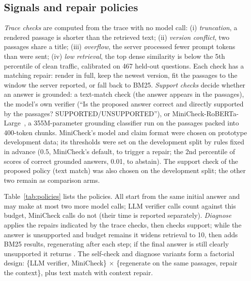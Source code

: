 \subsection{Signals and repair policies}
\emph{Trace checks} are computed from the trace with no model call: (i) \emph{truncation}, a rendered
passage is shorter than the retrieved text; (ii) \emph{version conflict}, two passages share a title;
(iii) \emph{overflow}, the server processed fewer prompt tokens than were sent; (iv) \emph{low
retrieval}, the top dense similarity is below the 5th percentile of clean traffic, calibrated on
467 held-out questions. Each check has a matching repair: render in full, keep the newest version,
fit the passages to the window the server reported, or fall back to BM25. \emph{Support checks}
decide whether an answer is grounded: a text-match check (the answer appears in the passages), the
model's own verifier (``Is the proposed answer correct and directly supported by the passages?
SUPPORTED/UNSUPPORTED''), or MiniCheck-RoBERTa-Large~\cite{tang2024minicheck}, a 355M-parameter
grounding classifier run on the passages packed into 400-token chunks. MiniCheck's model and claim
format were chosen on prototype development data; its thresholds were set on the development split by
rules fixed in advance (0.5, MiniCheck's default, to trigger a repair; the 2nd percentile of scores
of correct grounded answers, 0.01, to abstain). The support check of the proposed policy (text
match) was also chosen on the development split; the other two remain as comparison arms.

Table~\ref{tab:policies} lists the policies. All start from the same initial answer and may make at
most two more model calls; LLM verifier calls count against this budget, MiniCheck calls do not
(their time is reported separately). \emph{Diagnose} applies the repairs indicated by the trace
checks, then checks support; while the answer is unsupported and budget remains it widens
retrieval to 10, then adds BM25 results, regenerating after each step; if the final answer is
still clearly unsupported it returns \INS{}. The self-check and diagnose variants
form a factorial design: \{LLM verifier, MiniCheck\} $\times$ \{regenerate on the same passages,
repair the context\}, plus text match with context repair.

